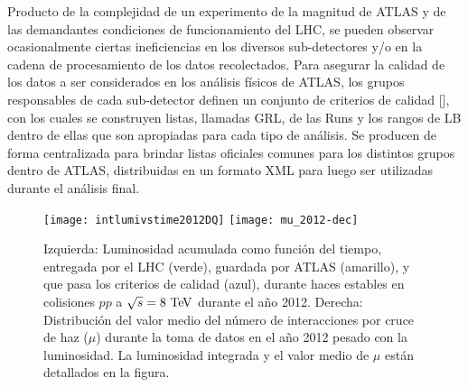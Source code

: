 

Producto de la complejidad de un experimento de la magnitud de ATLAS y de las
demandantes condiciones de funcionamiento del LHC, se pueden observar
ocasionalmente ciertas ineficiencias en los diversos sub-detectores y/o en la
cadena de procesamiento de los datos recolectados. Para asegurar la calidad de los
datos a ser considerados en los análisis físicos de ATLAS, los grupos
responsables de cada sub-detector definen un conjunto de criterios de
calidad [], con los cuales se construyen listas, llamadas GRL, de las
Runs y los rangos de LB dentro de ellas que son apropiadas para cada tipo de
análisis. Se producen de forma centralizada para brindar listas oficiales
comunes para los distintos grupos dentro de ATLAS, distribuidas en un formato
\textsc{XML} para luego ser utilizadas durante el análisis final.

\begin{figure}[!htbp]
  \centering

  \texttt{[image: intlumivstime2012DQ]}
  \texttt{[image: mu\_2012-dec]}

  \caption{Izquierda: Luminosidad acumulada como función del tiempo, entregada por el LHC (verde),
    guardada por ATLAS (amarillo), y que pasa los criterios de calidad (azul),
    durante haces estables en colisiones $pp$ a $\sqrt{s}=8\tev$ durante el a\~no 2012\cite{lumiplots}.
    Derecha: Distribución del valor medio del número de interacciones por cruce
    de haz ($\mu$) durante la toma de datos en el a\~no 2012 pesado con la luminosidad.
    La luminosidad integrada y el valor medio de $\mu$ están detallados en la figura.
  }
  \label{fig:lumi}

\end{figure}



